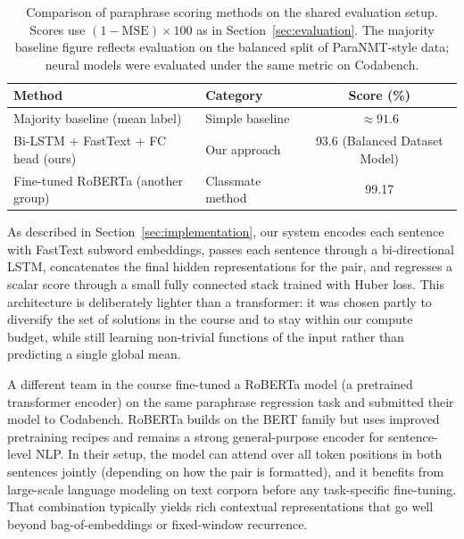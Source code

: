 \documentclass[11pt]{article}
\begin{document}
\begin{table}[t]
  \centering
  \small
  \setlength{\tabcolsep}{4pt}
  \begin{tabularx}{\columnwidth}{@{}>{\raggedright\arraybackslash}X >{\raggedright\arraybackslash}X c@{}}
    \hline
    \textbf{Method} & \textbf{Category} & \textbf{Score (\%)} \\
    \hline
    Majority baseline (mean label) & Simple baseline & $\approx 91.6$ \\
    \hline
    Bi-LSTM + FastText + FC head (ours) & Our approach & 93.6 (Balanced Dataset Model) \\
    \hline
    Fine-tuned RoBERTa (another group) & Classmate method & 99.17 \\
    \hline
  \end{tabularx}
  \caption{Comparison of paraphrase scoring methods on the shared evaluation setup. Scores use $(1-\mathrm{MSE})\times 100$ as in Section~\ref{sec:evaluation}. The majority baseline figure reflects evaluation on the balanced split of ParaNMT-style data; neural models were evaluated under the same metric on Codabench.}
  \label{tab:comparison-others}
\end{table}

As described in Section~\ref{sec:implementation}, our system encodes 
each sentence with FastText subword embeddings, passes each sentence 
through a bi-directional LSTM, concatenates the final hidden 
representations for the pair, and regresses a scalar score through 
a small fully connected stack trained with Huber loss. This architecture 
is deliberately lighter than a transformer: it was chosen partly to 
diversify the set of solutions in the course and to stay within our 
compute budget, while still learning non-trivial functions of the 
input rather than predicting a single global mean. 

A different team in the course fine-tuned a RoBERTa model (a pretrained 
transformer encoder) on the same paraphrase regression task and 
submitted their model to Codabench. RoBERTa builds on the BERT 
family but uses improved pretraining recipes and remains a strong 
general-purpose encoder for sentence-level NLP. In their setup, the 
model can attend over all token positions in both sentences jointly 
(depending on how the pair is formatted), and it benefits from 
large-scale language modeling on text corpora before any task-specific 
fine-tuning. That combination typically yields rich contextual 
representations that go well beyond bag-of-embeddings or 
fixed-window recurrence. 
\end{document}
